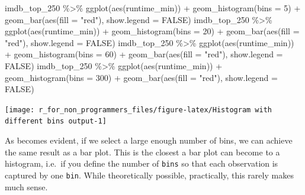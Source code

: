 \documentclass[
]{book}
\newenvironment{Shaded}{\begin{snugshade}}{\end{snugshade}}
\newcommand{\AttributeTok}[1]{\textcolor[rgb]{0.77,0.63,0.00}{#1}}
\newcommand{\ConstantTok}[1]{\textcolor[rgb]{0.00,0.00,0.00}{#1}}
\newcommand{\DecValTok}[1]{\textcolor[rgb]{0.00,0.00,0.81}{#1}}
\newcommand{\FunctionTok}[1]{\textcolor[rgb]{0.00,0.00,0.00}{#1}}
\newcommand{\NormalTok}[1]{#1}
\newcommand{\SpecialCharTok}[1]{\textcolor[rgb]{0.00,0.00,0.00}{#1}}
\newcommand{\StringTok}[1]{\textcolor[rgb]{0.31,0.60,0.02}{#1}}
\begin{document}
\begin{Shaded}
\begin{Highlighting}[]
\NormalTok{imdb\_top\_250 }\SpecialCharTok{\%\textgreater{}\%} 
  \FunctionTok{ggplot}\NormalTok{(}\FunctionTok{aes}\NormalTok{(runtime\_min)) }\SpecialCharTok{+}
  \FunctionTok{geom\_histogram}\NormalTok{(}\AttributeTok{bins =} \DecValTok{5}\NormalTok{) }\SpecialCharTok{+}
  \FunctionTok{geom\_bar}\NormalTok{(}\FunctionTok{aes}\NormalTok{(}\AttributeTok{fill =} \StringTok{"red"}\NormalTok{), }\AttributeTok{show.legend =} \ConstantTok{FALSE}\NormalTok{)}
\NormalTok{imdb\_top\_250 }\SpecialCharTok{\%\textgreater{}\%} 
  \FunctionTok{ggplot}\NormalTok{(}\FunctionTok{aes}\NormalTok{(runtime\_min)) }\SpecialCharTok{+}
  \FunctionTok{geom\_histogram}\NormalTok{(}\AttributeTok{bins =} \DecValTok{20}\NormalTok{) }\SpecialCharTok{+}
  \FunctionTok{geom\_bar}\NormalTok{(}\FunctionTok{aes}\NormalTok{(}\AttributeTok{fill =} \StringTok{"red"}\NormalTok{), }\AttributeTok{show.legend =} \ConstantTok{FALSE}\NormalTok{)}
\NormalTok{imdb\_top\_250 }\SpecialCharTok{\%\textgreater{}\%} 
  \FunctionTok{ggplot}\NormalTok{(}\FunctionTok{aes}\NormalTok{(runtime\_min)) }\SpecialCharTok{+}
  \FunctionTok{geom\_histogram}\NormalTok{(}\AttributeTok{bins =} \DecValTok{60}\NormalTok{) }\SpecialCharTok{+}
  \FunctionTok{geom\_bar}\NormalTok{(}\FunctionTok{aes}\NormalTok{(}\AttributeTok{fill =} \StringTok{"red"}\NormalTok{), }\AttributeTok{show.legend =} \ConstantTok{FALSE}\NormalTok{)}
\NormalTok{imdb\_top\_250 }\SpecialCharTok{\%\textgreater{}\%} 
  \FunctionTok{ggplot}\NormalTok{(}\FunctionTok{aes}\NormalTok{(runtime\_min)) }\SpecialCharTok{+}
  \FunctionTok{geom\_histogram}\NormalTok{(}\AttributeTok{bins =} \DecValTok{300}\NormalTok{) }\SpecialCharTok{+}
  \FunctionTok{geom\_bar}\NormalTok{(}\FunctionTok{aes}\NormalTok{(}\AttributeTok{fill =} \StringTok{"red"}\NormalTok{), }\AttributeTok{show.legend =} \ConstantTok{FALSE}\NormalTok{)}
\end{Highlighting}
\end{Shaded}

\begin{center}\texttt{[image: r\_for\_non\_programmers\_files/figure-latex/Histogram with different bins output-1]} \end{center}

As becomes evident, if we select a large enough number of bins, we can achieve the same result as a bar plot. This is the closest a bar plot can become to a histogram, i.e.~if you define the number of \texttt{bins} so that each observation is captured by one \texttt{bin}. While theoretically possible, practically, this rarely makes much sense.
\end{document}

